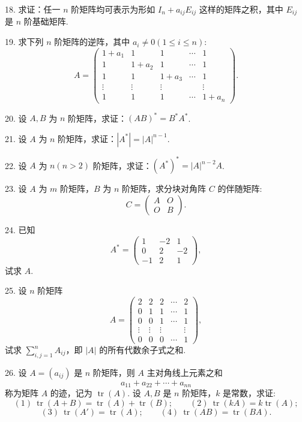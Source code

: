 \documentclass[UTF8,12pt,a4paper,fontset=fandol]{ctexart}
\begin{document}
18. 求证：任一 $n$ 阶矩阵均可表示为形如 $I_n+a_{ij}E_{ij}$ 这样的矩阵之积，其中 $E_{ij}$ 是 $n$ 阶基础矩阵.

19. 求下列 $n$ 阶矩阵的逆阵，其中 $a_i\neq 0(1\leq i\leq n)$:
\[
A=\left(\begin{array}{ccccc}
1+a_1 & 1 & 1 & \cdots & 1\\
1 & 1+a_2 & 1 & \cdots & 1\\
1 & 1 & 1+a_3 & \cdots & 1\\
\vdots & \vdots & \vdots & & \vdots\\
1 & 1 & 1 & \cdots & 1+a_n
\end{array}\right).
\]

20. 设 $A,B$ 为 $n$ 阶矩阵，求证：$(AB)^*=B^*A^*$.

21. 设 $A$ 为 $n$ 阶矩阵，求证：$|A^*|=|A|^{n-1}$.

22. 设 $A$ 为 $n(n>2)$ 阶矩阵，求证：$(A^*)^*=|A|^{n-2}A$.

23. 设 $A$ 为 $m$ 阶矩阵，$B$ 为 $n$ 阶矩阵，求分块对角阵 $C$ 的伴随矩阵:
\[
C=\left(\begin{array}{cc}
A & O\\
O & B
\end{array}\right).
\]

24. 已知
\[
A^*=\left(\begin{array}{ccc}
1 & -2 & 1\\
0 & 2 & -2\\
-1 & 2 & 1
\end{array}\right),
\]
试求 $A$.

25. 设 $n$ 阶矩阵
\[
A=\left(\begin{array}{ccccc}
2 & 2 & 2 & \cdots & 2\\
0 & 1 & 1 & \cdots & 1\\
0 & 0 & 1 & \cdots & 1\\
\vdots & \vdots & \vdots & & \vdots\\
0 & 0 & 0 & \cdots & 1
\end{array}\right),
\]
试求 $\sum\limits_{i,j=1}^n A_{ij}$，即 $|A|$ 的所有代数余子式之和.

26. 设 $A=(a_{ij})$ 是 $n$ 阶矩阵，则 $A$ 主对角线上元素之和
\[
a_{11}+a_{22}+\cdots+a_{nn}
\]
称为矩阵 $A$ 的迹，记为 $\operatorname{tr}(A)$. 设 $A,B$ 是 $n$ 阶矩阵，$k$ 是常数，求证:
\[
(1)\ \operatorname{tr}(A+B)=\operatorname{tr}(A)+\operatorname{tr}(B);\qquad
(2)\ \operatorname{tr}(kA)=k\operatorname{tr}(A);
\]
\[
(3)\ \operatorname{tr}(A')=\operatorname{tr}(A);\qquad
(4)\ \operatorname{tr}(AB)=\operatorname{tr}(BA).
\]
\end{document}
